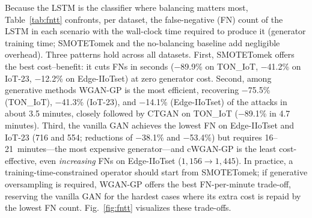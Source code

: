 ﻿\documentclass[journal]{IEEEtran}
\begin{document}
Because the LSTM is the classifier where balancing matters most, Table~\ref{tab:fntt} confronts, per dataset, the false-negative (FN) count of the LSTM in each scenario with the wall-clock time required to produce it (generator training time; SMOTETomek and the no-balancing baseline add negligible overhead). Three patterns hold across all datasets. First, SMOTETomek offers the best cost--benefit: it cuts FNs in seconds ($-$89.9\% on TON\_IoT, $-$41.2\% on IoT-23, $-$12.2\% on Edge-IIoTset) at zero generator cost. Second, among generative methods WGAN-GP is the most efficient, recovering $-$75.5\% (TON\_IoT), $-$41.3\% (IoT-23), and $-$14.1\% (Edge-IIoTset) of the attacks in about 3.5 minutes, closely followed by CTGAN on TON\_IoT ($-$89.1\% in 4.7 minutes). Third, the vanilla GAN achieves the lowest FN on Edge-IIoTset and IoT-23 (716 and 554; reductions of $-$38.1\% and $-$53.4\%) but requires 16--21~minutes---the most expensive generator---and cWGAN-GP is the least cost-effective, even \emph{increasing} FNs on Edge-IIoTset ($1{,}156\rightarrow1{,}445$). In practice, a training-time-constrained operator should start from SMOTETomek; if generative oversampling is required, WGAN-GP offers the best FN-per-minute trade-off, reserving the vanilla GAN for the hardest cases where its extra cost is repaid by the lowest FN count. Fig.~\ref{fig:fntt} visualizes these trade-offs.
\end{document}
